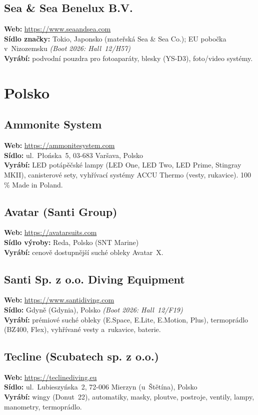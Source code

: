 \documentclass[11pt,a4paper]{article}
\begin{document}
\subsection{Sea \& Sea Benelux B.V.}
\textbf{Web:} \url{https://www.seaandsea.com} \\
\textbf{Sídlo značky:} Tokio, Japonsko (mateřská Sea \& Sea Co.); EU pobočka v~Nizozemsku \quad\emph{(Boot 2026: Hall~12/H57)} \\
\textbf{Vyrábí:} podvodní pouzdra pro fotoaparáty, blesky (YS-D3), foto/video systémy.

\section{Polsko}

\subsection{Ammonite System}
\textbf{Web:} \url{https://ammonitesystem.com} \\
\textbf{Sídlo:} ul.~Płońska~5, 03-683 Varšava, Polsko \\
\textbf{Vyrábí:} LED potápěčské lampy (LED One, LED Two, LED Prime, Stingray MKII), canisterové sety, vyhřívací systémy ACCU Thermo (vesty, rukavice). 100\,\% Made in Poland.

\subsection{Avatar (Santi Group)}
\textbf{Web:} \url{https://avatarsuits.com} \\
\textbf{Sídlo výroby:} Reda, Polsko (SNT Marine) \\
\textbf{Vyrábí:} cenově dostupnější suché obleky Avatar~X.

\subsection{Santi Sp. z o.o. Diving Equipment}
\textbf{Web:} \url{https://www.santidiving.com} \\
\textbf{Sídlo:} Gdyně (Gdynia), Polsko \quad\emph{(Boot 2026: Hall~12/F19)} \\
\textbf{Vyrábí:} prémiové suché obleky (E.Space, E.Lite, E.Motion, Plus), termoprádlo (BZ400, Flex), vyhřívané vesty a~rukavice, baterie.

\subsection{Tecline (Scubatech sp. z o.o.)}
\textbf{Web:} \url{https://teclinediving.eu} \\
\textbf{Sídlo:} ul.~Lubieszyńska~2, 72-006 Mierzyn (u~Štětína), Polsko \\
\textbf{Vyrábí:} wingy (Donut~22), automatiky, masky, ploutve, postroje, ventily, lampy, manometry, termoprádlo.
\end{document}
